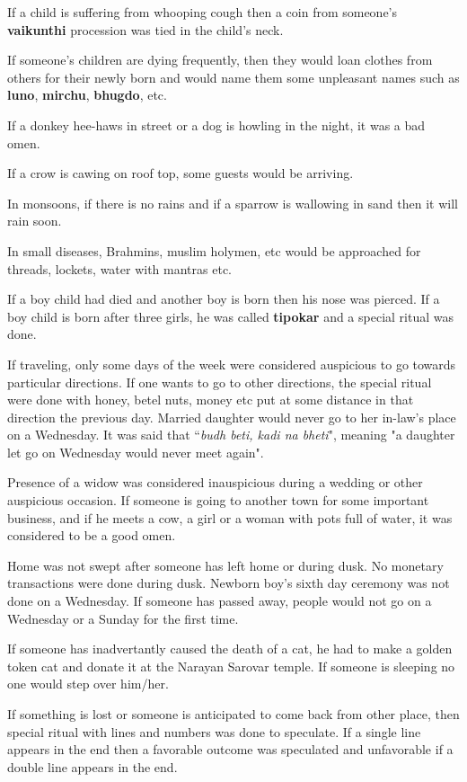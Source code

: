 If a child is suffering from whooping cough then a coin from someone's
\textbf{vaikunthi} procession was tied in the child's neck. 

If someone's children are dying frequently, then they would loan clothes from
others for their newly born and would name them some unpleasant names such as
\textbf{luno}, \textbf{mirchu}, \textbf{bhugdo}, etc.

If a donkey hee-haws in street or a dog is howling in the night, it was a bad
omen.

If a crow is cawing on roof top, some guests would be arriving.

In monsoons, if there is no rains and if a sparrow is wallowing in sand then it
will rain soon.

In small diseases, Brahmins, muslim holymen, etc would be approached for
threads, lockets, water with mantras etc.

If a boy child had died and another boy is born then his nose was pierced. If a
boy child is born after three girls, he was called \textbf{tipokar} and a
special ritual was done.

If traveling, only some days of the week were considered auspicious to go
towards particular directions. If one wants to go to other directions, the
special ritual were done with honey, betel nuts, money etc put at some distance
in that direction the previous day. Married daughter would never go to her
in-law's place on a Wednesday. It was said that ``\textit{budh beti, kadi na
bheti}", meaning "a daughter let go on Wednesday would never meet again".

Presence of a widow was considered inauspicious during a wedding or other
auspicious occasion. If someone is going to another town for some important
business, and if he meets a cow, a girl or a woman with pots full of water, it
was considered to be a good omen.

Home was not swept after someone has left home or during dusk. No monetary
transactions were done during dusk. Newborn boy's sixth day ceremony was not
done on a Wednesday. If someone has passed away, people would not go on a
Wednesday or a Sunday for the first time.

If someone has inadvertantly caused the death of a cat, he had to make a golden
token cat and donate it at the Narayan Sarovar temple. If someone is sleeping
no one would step over him/her.

If something is lost or someone is anticipated to come back from other place,
then special ritual with lines and numbers was done to speculate. If a single
line appears in the end then a favorable outcome was speculated and unfavorable
if a double line appears in the end. 


